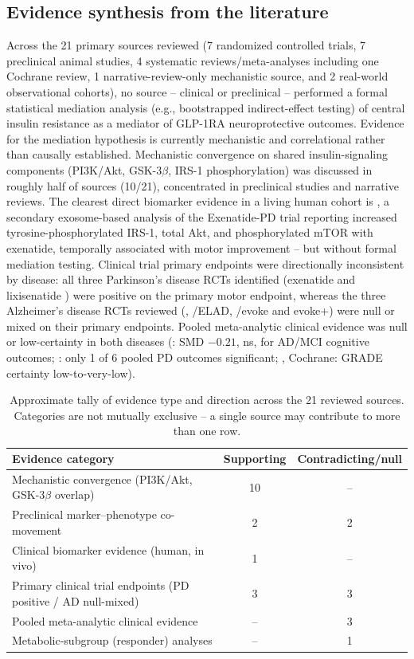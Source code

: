\documentclass[11pt, a4paper]{article}
\begin{document}
\subsection{Evidence synthesis from the literature}
Across the 21 primary sources reviewed (7 randomized controlled trials, 7
preclinical animal studies, 4 systematic reviews/meta-analyses including one
Cochrane review, 1 narrative-review-only mechanistic source, and 2
real-world observational cohorts), no source -- clinical or preclinical --
performed a formal statistical mediation analysis (e.g., bootstrapped
indirect-effect testing) of central insulin resistance as a mediator of
GLP-1RA neuroprotective outcomes. Evidence for the mediation hypothesis is
currently mechanistic and correlational rather than causally established.
Mechanistic convergence on shared insulin-signaling components (PI3K/Akt,
GSK-3$\beta$, IRS-1 phosphorylation) was discussed in roughly half of
sources (10/21), concentrated in preclinical studies and narrative reviews.
The clearest direct biomarker evidence in a living human cohort is
\citet{athauda2019}, a secondary exosome-based analysis of the Exenatide-PD
trial reporting increased tyrosine-phosphorylated IRS-1, total Akt, and
phosphorylated mTOR with exenatide, temporally associated with motor
improvement -- but without formal mediation testing. Clinical trial primary
endpoints were directionally inconsistent by disease: all three Parkinson's
disease RCTs identified (exenatide \citep{avilesolmos2013,athauda2017} and
lixisenatide \citep{meissner2024}) were positive on the primary motor
endpoint, whereas the three Alzheimer's disease RCTs reviewed
(\citet{gejl2016}, \citet{edison2025}/ELAD, \citet{cummings2026}/evoke and
evoke+) were null or mixed on their primary endpoints. Pooled
meta-analytic clinical evidence was null or low-certainty in both diseases
(\citet{santos2026}: SMD $-0.21$, ns, for AD/MCI cognitive outcomes;
\citet{helal2025}: only 1 of 6 pooled PD outcomes significant;
\citet{mulvaney2020}, Cochrane: GRADE certainty low-to-very-low).

\begin{table}[h]
\centering
\caption{Approximate tally of evidence type and direction across the 21
reviewed sources. Categories are not mutually exclusive -- a single source
may contribute to more than one row.}
\label{tab:evidence-summary}
\begin{tabular}{@{}lcc@{}}
\toprule
\textbf{Evidence category} & \textbf{Supporting} & \textbf{Contradicting/null} \\
\midrule
Mechanistic convergence (PI3K/Akt, GSK-3$\beta$ overlap) & 10 & -- \\
Preclinical marker--phenotype co-movement & 2 & 2 \\
Clinical biomarker evidence (human, in vivo) & 1 & -- \\
Primary clinical trial endpoints (PD positive / AD null-mixed) & 3 & 3 \\
Pooled meta-analytic clinical evidence & -- & 3 \\
Metabolic-subgroup (responder) analyses & -- & 1 \\
\bottomrule
\end{tabular}
\end{table}
\end{document}
